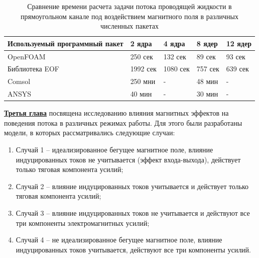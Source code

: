 \begin{table}[]
\caption{Сравнение времени расчета задачи потока проводящей жидкости в прямоугольном канале под воздействием магнитного поля в различных численных пакетах}
\begin{tabular}{|l|l|l|l|l|}
\hline
Используемый программный пакет & 2 ядра        & 4 ядра       & 8  ядер    & 12   ядер   \\ \hline
OpenFOAM                       & 250 сек  & 132 сек  & 89 сек  & 93 сек  \\ \hline
Библиотека EOF                 & 1992 сек & 1080 сек & 757 сек & 639 сек \\ \hline
Comsol                         & 250  мни & -        & 48 мин  & -       \\ \hline
ANSYS                          & 40 мин   & -        & 30 мин  & -       \\ \hline
\end{tabular}
\label{tab:comparision}
\end{table}



\underline{\textbf{Третья глава}} посвящена исследованию влияния магнитных эффектов на поведения потока в различных режимах работы. Для этого были разработаны модели, в которых рассматривались следующие случаи:

\begin{enumerate}
    \item Случай 1 -- идеализированное бегущее магнитное поле, влияние индуцированных токов не учитывается (эффект входа-выхода), действует только тяговая компонента усилий;
    \item Случай 2 --  влияние индуцированных токов учитывается и действует только тяговая компонента усилий;
    \item Случай 3 -- влияние индуцированных токов не учитывается и действуют все три компоненты электромагнитных усилий;
    \item Случай 4 -- не идеализированное бегущее магнитное поле, влияние индуцированных токов учитывается, действуют все три компоненты усилий. 
\end{enumerate}


